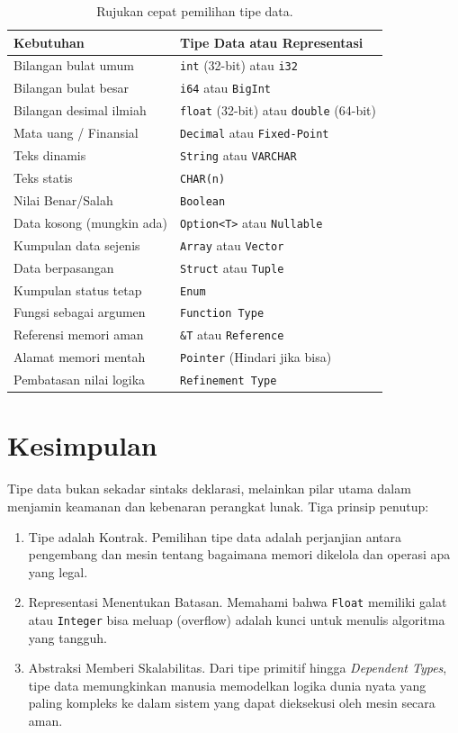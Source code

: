 \documentclass[11pt,a4paper]{article}
\begin{document}
	\begin{table}[H]
		\centering
		\caption{Rujukan cepat pemilihan tipe data.}
		\label{tab:cheat}
		\footnotesize
		\begin{tabularx}{\textwidth}{l X}
			\toprule
			Kebutuhan & Tipe Data atau Representasi \\
			\midrule
			Bilangan bulat umum & \texttt{int} (32-bit) atau \texttt{i32} \\
			Bilangan bulat besar & \texttt{i64} atau \texttt{BigInt} \\
			Bilangan desimal ilmiah & \texttt{float} (32-bit) atau \texttt{double} (64-bit) \\
			Mata uang / Finansial & \texttt{Decimal} atau \texttt{Fixed-Point} \\
			Teks dinamis & \texttt{String} atau \texttt{VARCHAR} \\
			Teks statis & \texttt{CHAR(n)} \\
			Nilai Benar/Salah & \texttt{Boolean} \\
			Data kosong (mungkin ada) & \texttt{Option<T>} atau \texttt{Nullable} \\
			Kumpulan data sejenis & \texttt{Array} atau \texttt{Vector} \\
			Data berpasangan & \texttt{Struct} atau \texttt{Tuple} \\
			Kumpulan status tetap & \texttt{Enum} \\
			Fungsi sebagai argumen & \texttt{Function Type} \\
			Referensi memori aman & \texttt{\&T} atau \texttt{Reference} \\
			Alamat memori mentah & \texttt{Pointer} (Hindari jika bisa) \\
			Pembatasan nilai logika & \texttt{Refinement Type} \\
			\bottomrule
		\end{tabularx}
	\end{table}
	
	\section{Kesimpulan}
	
	Tipe data bukan sekadar sintaks deklarasi, melainkan pilar utama dalam menjamin keamanan dan kebenaran perangkat lunak. Tiga prinsip penutup:
	
	\begin{enumerate}
		\item Tipe adalah Kontrak. Pemilihan tipe data adalah perjanjian antara pengembang dan mesin tentang bagaimana memori dikelola dan operasi apa yang legal.
		\item Representasi Menentukan Batasan. Memahami bahwa \texttt{Float} memiliki galat atau \texttt{Integer} bisa meluap (overflow) adalah kunci untuk menulis algoritma yang tangguh.
		\item Abstraksi Memberi Skalabilitas. Dari tipe primitif hingga \textit{Dependent Types}, tipe data memungkinkan manusia memodelkan logika dunia nyata yang paling kompleks ke dalam sistem yang dapat dieksekusi oleh mesin secara aman.
	\end{enumerate}
	
\end{document}
